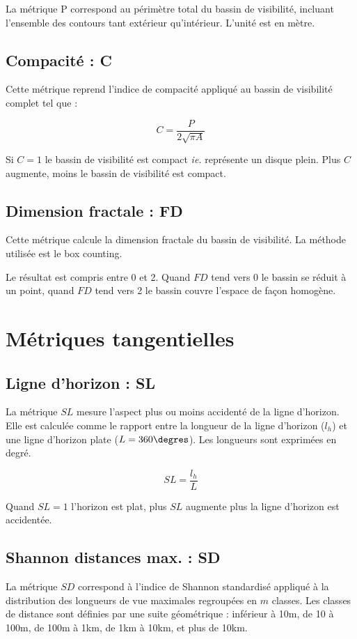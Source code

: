 \documentclass{report}
\begin{document}
La métrique P correspond au périmètre total du bassin de visibilité, incluant l'ensemble des contours tant extérieur qu'intérieur. L'unité est en mètre.


\subsection{Compacité : C}
Cette métrique reprend l'indice de compacité appliqué au bassin de visibilité complet tel que :

$$C=\frac{P}{2\sqrt{\pi A}}$$

Si $C=1$ le bassin de visibilité est compact \textit{ie.} représente un disque plein. Plus $C$ augmente, moins le bassin de visibilité est compact.


\subsection{Dimension fractale : FD}
Cette métrique calcule la dimension fractale du bassin de visibilité. La méthode utilisée est le box counting.

Le résultat est compris entre 0 et 2. Quand $FD$ tend vers 0 le bassin se réduit à un point, quand $FD$ tend vers 2 le bassin couvre l'espace de façon homogène.

\section{Métriques tangentielles}

\subsection{Ligne d'horizon : SL}

La métrique $SL$ mesure l'aspect plus ou moins accidenté de la ligne d'horizon. Elle est calculée comme le rapport entre la longueur de la ligne d'horizon ($l_h$) et une ligne d'horizon plate ($L=360\degres$). Les longueurs sont exprimées en degré. 

$$SL=\frac{l_h}{L}$$

Quand $SL=1$ l'horizon est plat, plus $SL$ augmente plus la ligne d'horizon est accidentée.

\subsection{Shannon distances max. : SD}
La métrique $SD$ correspond à l’indice de Shannon standardisé appliqué à la distribution des longueurs de vue maximales regroupées en $m$ classes. Les classes de distance sont définies par une suite géométrique : inférieur à 10m, de 10 à 100m, de 100m à 1km, de 1km à 10km, et plus de 10km.
\end{document}
